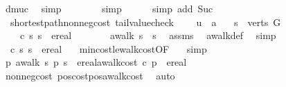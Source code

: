 \begin{isabellebody}
\ dmuc\ \isamarkupfalse%
\ simp\isanewline
\ \ \ \ \ \ \isamarkupfalse%
\ simp\isanewline
\ \ \ \ \isamarkupfalse%
\ {\isacharparenleft}simp\ add{\isacharcolon}\ Suc{\isacharparenleft}{}{\isacharcomma}{}{\isacharparenright}{\isacharparenright}\isanewline
\ \ \isamarkupfalse%
\isanewline
{}\isamarkupfalse%
%
\endisatagproof
{\isafoldproof}%
%
\isadelimproof
\isanewline
%
\endisadelimproof
\isanewline
{}\isamarkupfalse%
\ {\isacharparenleft}\ shortest{\isacharunderscore}path{\isacharunderscore}non{\isacharunderscore}neg{\isacharunderscore}cost{\isacharparenright}\ tail{\isacharunderscore}value{\isacharunderscore}check{\isacharcolon}\ \isanewline
\ \ \ u\ {\isacharcolon}{\isacharcolon}\ {\isacharprime}a\isanewline
\ \ \ {\isachardoublequoteopen}s\ {\isasymin}\ verts\ G{\isachardoublequoteclose}\isanewline
\ \ \ {\isachardoublequoteopen}{\isasymmu}\ c\ s\ s\ {\isacharequal}\ ereal\ {}{\isachardoublequoteclose}\isanewline
%
\isadelimproof
%
\endisadelimproof
%
\isatagproof
{}\isamarkupfalse%
\ {\isacharminus}\isanewline
\ \ \isamarkupfalse%
\ {\isacharasterisk}{\isacharcolon}\ {\isachardoublequoteopen}awalk\ s\ {\isacharbrackleft}{\isacharbrackright}\ s{\isachardoublequoteclose}\ \isamarkupfalse%
\ assms\ \isamarkupfalse%
\ awalk{\isacharunderscore}def\ \isamarkupfalse%
\ simp\isanewline
\ \ \isamarkupfalse%
\ {\isachardoublequoteopen}{\isasymmu}\ c\ s\ s\ {\isasymle}\ ereal\ {}{\isachardoublequoteclose}\ \isamarkupfalse%
\ min{\isacharunderscore}cost{\isacharunderscore}le{\isacharunderscore}walk{\isacharunderscore}cost{\isacharbrackleft}OF\ {\isacharasterisk}{\isacharbrackright}\ \isamarkupfalse%
\ simp\isanewline
\ \ \isamarkupfalse%
\isanewline
\ \ \isamarkupfalse%
\ {\isachardoublequoteopen}{\isacharparenleft}{\isasymAnd}p{\isachardot}\ awalk\ s\ p\ s\ {\isasymLongrightarrow}\ ereal{\isacharparenleft}awalk{\isacharunderscore}cost\ c\ p{\isacharparenright}\ {\isasymge}\ ereal\ {}{\isacharparenright}{\isachardoublequoteclose}\isanewline
\ \ \ \isamarkupfalse%
\ non{\isacharunderscore}neg{\isacharunderscore}cost\ pos{\isacharunderscore}cost{\isacharunderscore}pos{\isacharunderscore}awalk{\isacharunderscore}cost\ \isamarkupfalse%
\ auto\isanewline

\end{isabellebody}
